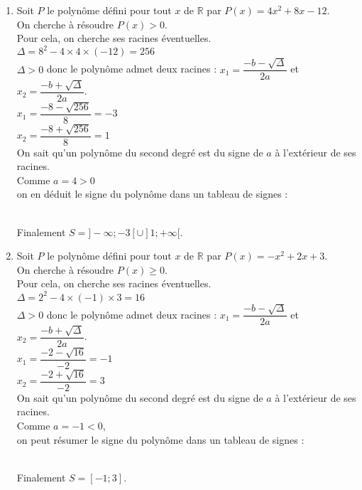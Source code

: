 \documentclass[a4paper,11pt,exos]{nsi} %
\begin{document}
\begin{enumerate}[itemsep=1em]
    \item Soit $P$ le polynôme défini pour tout $x$ de $\mathbb R$ par $P(x)=4x^2+8x-12$.\\On cherche à résoudre $P(x)>0$.\\Pour cela, on cherche ses racines éventuelles.\\$\Delta = 8^2-4\times4\times(-12)=256$\\$\Delta>0$ donc le polynôme admet deux racines : $x_1 = \dfrac{-b-\sqrt{\Delta}}{2a}$ et $x_2 = \dfrac{-b+\sqrt{\Delta}}{2a}$.\\$x_1 =\dfrac{-8-\sqrt{256}}{8}=-3$\\$x_2 =\dfrac{-8+\sqrt{256}}{8}=1$\\On sait qu'un polynôme du second degré est du signe de $a$ à l'extérieur de ses racines.\\Comme $a=4>0$\\on en déduit le signe du polynôme dans un tableau de signes :\\
    \\[.5em]
    Finalement $S=]-\infty;-3[\cup]1;+\infty[$.
    
    \item Soit $P$ le polynôme défini pour tout $x$ de $\mathbb R$ par $P(x)=-x^2+2x+3$.\\On cherche à résoudre $P(x)\geq 0$.\\Pour cela, on cherche ses racines éventuelles.\\$\Delta = 2^2-4\times(-1)\times3=16$\\$\Delta>0$ donc  le polynôme admet deux racines : $x_1 = \dfrac{-b-\sqrt{\Delta}}{2a}$ et $x_2 = \dfrac{-b+\sqrt{\Delta}}{2a}$.\\$x_1 =\dfrac{-2-\sqrt{16}}{-2}=-1$\\$x_2 =\dfrac{-2+\sqrt{16}}{-2}=3$\\On sait qu'un polynôme du second degré est du signe de $a$ à l'extérieur de ses racines.\\Comme $a=-1<0$, \\on peut résumer le signe du polynôme dans un tableau de signes :\\
    \\[.5em]
    Finalement $S=[-1;3]$.
    \end{enumerate}
\end{document}
